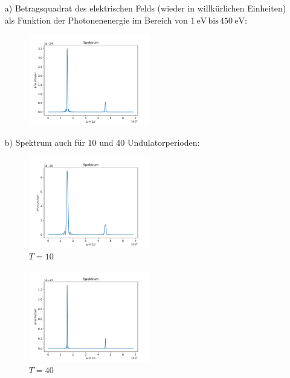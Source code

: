 \documentclass[11pt,a4paper]{article}
\begin{document}
		\begin{itemize}
			\item[a)] Betragsquadrat des elektrischen Felds (wieder in willkürlichen Einheiten) als Funktion der Photonenenergie 
			im Bereich von $\SI{1}{\electronvolt} \, \text{bis} \, \SI{450}{\electronvolt}$:
			\begin{figure}[H]
				\centering
				\includegraphics[width=0.5\textwidth]{build/spektrum_K1.5_Perioden20_neu.pdf}
			\end{figure}

			\item[b)] Spektrum auch für 10 und 40 Undulatorperioden:

			\begin{figure}[H]
				\centering
				\includegraphics[width=0.5\textwidth]{build/spektrum_K1.5_Perioden10_neu.pdf}
				\caption{$T = 10$}
			\end{figure}

			\begin{figure}[H]
				\centering
				\includegraphics[width=0.5\textwidth]{build/spektrum_K1.5_Perioden40_neu.pdf}
				\caption{$T = 40$}
			\end{figure}


\end{itemize}
\end{document}

